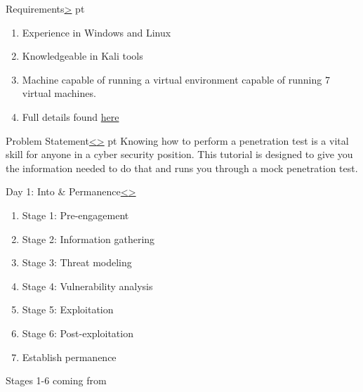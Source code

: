 \documentclass[12pt]{extarticle}
\newenvironment{instructionblock}{\Large\bgroup}{\egroup}
\newcounter{next}
\newcounter{prev}
\begin{document}
\pagebreak
{}
\setcounter{section}{1}
\begin{slide}{Requirements}{\hyperref[slide \thenext]{\textgreater}}
	 pt
	\begin{instructionblock}		
		\begin{enumerate}
        \item Experience in Windows and Linux
		\item Knowledgeable in Kali tools
        \item Machine capable of running a virtual environment capable of running 7 virtual machines.
        \item Full details found \hyperref[fig:NetworkMap]{here}
		\end{enumerate}
	\end{instructionblock}
\end{slide}

\pagebreak
{}
\begin{slide}{Problem Statement}{\hyperref[slide \theprev]{\textless}\hyperref[slide \thenext]{\textgreater}}
	 pt
	\begin{instructionblock}		
		Knowing how to perform a penetration test is a vital skill for anyone in a cyber security position. This tutorial is designed to give you the information needed to do that and runs you through a mock penetration test.
	\end{instructionblock}
\end{slide}

\pagebreak
{}
\begin{slide}{Day 1: Into \& Permanence}{\hyperref[slide \theprev]{\textless}\hyperref[slide \thenext]{\textgreater}}
	\begin{instructionblock}
    	\begin{enumerate}
        	\item Stage 1: Pre-engagement
            \item Stage 2: Information gathering
            \item Stage 3: Threat modeling
            \item Stage 4: Vulnerability analysis
            \item Stage 5: Exploitation
            \item Stage 6: Post-exploitation
            \item Establish permanence
        \end{enumerate}
        \vspace{-.1in}
        \begin{small}
        	Stages 1-6 coming from\cite[Chapter 0]{Ref:Weidman}
        \end{small}
	\end{instructionblock}
\end{slide}
\end{document}
